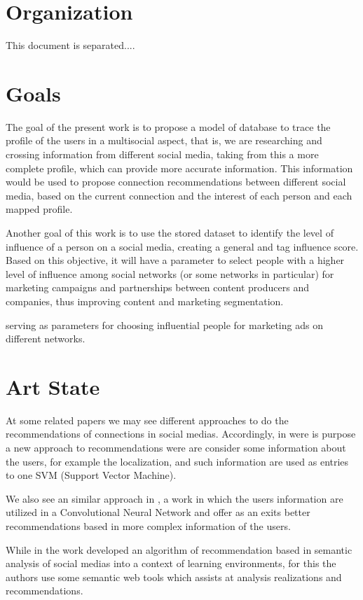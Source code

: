 \section{Organization}
This document is separated....

\section{Goals}

The goal of the present work is to propose a model of database to trace the profile of the users in a multisocial aspect, that is, we are researching and crossing information from different social media, taking from this a more complete profile, which can provide more accurate information. This information would be used to propose connection recommendations between different social media, based on the current connection and the interest of each person and each mapped profile.

Another goal of this work is to use the stored dataset to identify the level of influence of a person on a social media, creating a general and tag influence score. Based on this objective, it will have a parameter to select people with a higher level of influence among social networks (or some networks in particular) for marketing campaigns and partnerships between content producers and companies, thus improving content and marketing segmentation.

serving as parameters for choosing influential people for marketing ads on different networks.


\section{Art State}

At some related papers we may see different approaches to do the recommendations of connections in social medias. Accordingly, in \cite{multi-feature-recommendation} were is purpose a new approach to recommendations were are consider some information about the users, for example the localization, and such information are used as entries to one SVM (Support Vector Machine).

We also see an similar approach in \cite{convolutional-network}, a work in which the users information are utilized in a Convolutional Neural Network and offer as an exits better recommendations based in more complex information of the users.

While in \cite{semantic-analysis-recommendation} the work developed an algorithm of recommendation based in semantic analysis of social medias into a context of learning environments, for this the authors use some semantic web tools which assists at analysis realizations and recommendations. 

